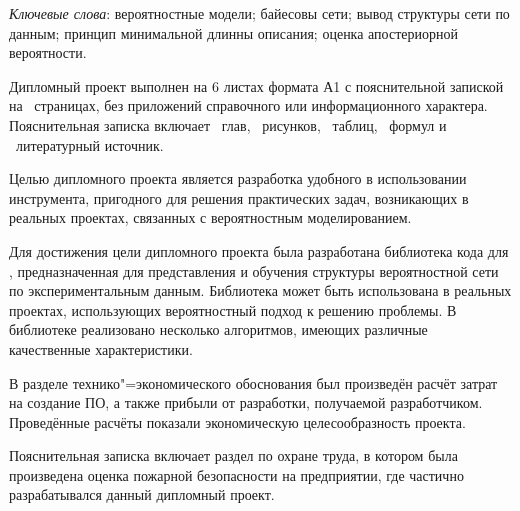\thispagestyle{empty}

\emph{Ключевые слова}: вероятностные модели; байесовы сети; вывод структуры сети по данным; принцип минимальной длинны описания; оценка апостериорной вероятности.

\vspace{4\parsep}

Дипломный проект выполнен на 6 листах формата А1 с пояснительной запиской на~\pageref*{LastPage} страницах, без приложений справочного или информационного характера. 
Пояснительная записка включает ~глав, \totfig{}~рисунков, \tottab{}~таблиц, \toteq{}~формул и \totref{}~литературный источник.

Целью дипломного проекта является разработка удобного в использовании инструмента, пригодного для решения практических задач, возникающих в реальных проектах, связанных с вероятностным моделированием.

Для достижения цели дипломного проекта была разработана библиотека кода для \dotnet{}, предназначенная для представления и обучения структуры вероятностной сети по экспериментальным данным.
Библиотека может быть использована в реальных проектах, использующих вероятностный подход к решению проблемы.
В библиотеке реализовано несколько алгоритмов, имеющих различные качественные характеристики.

В разделе технико"=экономического обоснования был произведён расчёт затрат на создание ПО, а также прибыли от разработки, получаемой разработчиком.
Проведённые расчёты показали экономическую целесообразность проекта.

Пояснительная записка включает раздел по охране труда, в котором была произведена оценка пожарной безопасности на предприятии, где частично разрабатывался данный дипломный проект.

\clearpage